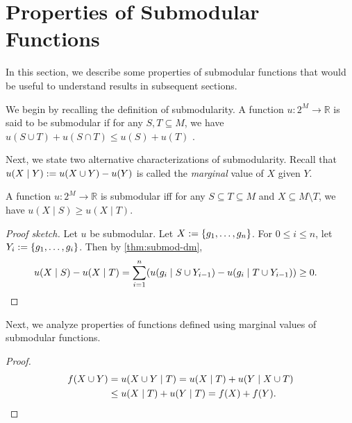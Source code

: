 \section{Properties of Submodular Functions}
\label{sec:submod-funcs}

In this section, we describe some properties of submodular functions that would be
useful to understand results in subsequent sections.


We begin by recalling the definition of submodularity.
A function $u: 2^M \to \mathbb{R}$ is said to be submodular if for any $S, T \subseteq M$,
we have $u(S \cup T) + u(S \cap T) \le u(S) + u(T)$ \citep{schrijver2003submodular}.

Next, we state two alternative characterizations of submodularity.
Recall that $u(X \mid Y) := u(X \cup Y) - u(Y)$ is called
the \emph{marginal} value of $X$ given $Y$.


\begin{lemma}
A function $u: 2^M \to \mathbb{R}$ is submodular iff
for any $S \subseteq T \subseteq M$ and $X \subseteq M \setminus T$,
we have $u(X \mid S) \ge u(X \mid T)$.
\end{lemma}
\begin{proof}[Proof sketch]
Let $u$ be submodular. Let $X := \{g_1, \ldots, g_n\}$.
For $0 \le i \le n$, let $Y_i := \{g_1, \ldots, g_i\}$.
Then by \cref{thm:submod-dm},
\begin{align*}
& u(X \mid S) - u(X \mid T)
\relax= \sum_{i=1}^n (u(g_i \mid S \cup Y_{i-1}) - u(g_i \mid T \cup Y_{i-1}))
    \ge 0.
\qedhere
\end{align*}
\end{proof}

Next, we analyze properties of functions defined using marginal values of submodular functions.

\begin{proof}
\begin{align*}
f(X \cup Y) &= u(X \cup Y \mid T)
\relax= u(X \mid T) + u(Y \mid X \cup T)
\\ &\le u(X \mid T) + u(Y \mid T)
\relax= f(X) + f(Y).
\qedhere
\end{align*}
\end{proof}

